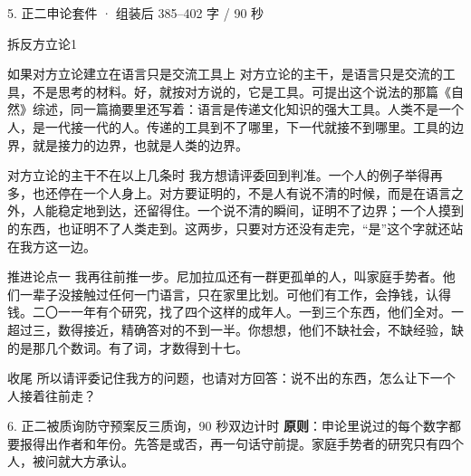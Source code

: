 \documentclass[script,pro]{debate}
\begin{document}
\begin{kit}{5. 正二申论}{套件 · 组装后 385–402 字 / 90 秒}
\begin{pick}{拆反方立论}{1}
\begin{module}{如果对方立论建立在语言只是交流工具上}
对方立论的主干，是语言只是交流的工具，不是思考的材料。好，就按对方说的，它是工具。可提出这个说法的那篇《自然》综述，同一篇摘要里还写着：语言是传递文化知识的强大工具。人类不是一个人，是一代接一代的人。传递的工具到不了哪里，下一代就接不到哪里。工具的边界，就是接力的边界，也就是人类的边界。
\end{module}
\begin{fallback}{对方立论的主干不在以上几条时}
我方想请评委回到判准。一个人的例子举得再多，也还停在一个人身上。对方要证明的，不是人有说不清的时候，而是在语言之外，人能稳定地到达，还留得住。一个说不清的瞬间，证明不了边界；一个人摸到的东西，也证明不了人类走到。这两步，只要对方还没有走完，“是”这个字就还站在我方这一边。
\end{fallback}
\end{pick}
\begin{fixed}{推进论点一}
我再往前推一步。尼加拉瓜还有一群更孤单的人，叫家庭手势者。他们一辈子没接触过任何一门语言，只在家里比划。可他们有工作，会挣钱，认得钱。二〇一一年有个研究，找了四个这样的成年人。一到三个东西，他们全对。一超过三，数得接近，精确答对的不到一半。你想想，他们不缺社会，不缺经验，缺的是那几个数词。有了词，才数得到十七。
\end{fixed}
\begin{fixed}{收尾}
所以请评委记住我方的问题，也请对方回答：说不出的东西，怎么让下一个人接着往前走？
\end{fixed}
\end{kit}

\begin{stage}{6. 正二被质询防守预案}{反三质询，90 秒双边计时}
\textbf{原则}：申论里说过的每个数字都要报得出作者和年份。先答是或否，再一句话守前提。家庭手势者的研究只有四个人，被问就大方承认。
\begin{qa}
\end{qa}
\end{stage}
\end{document}
